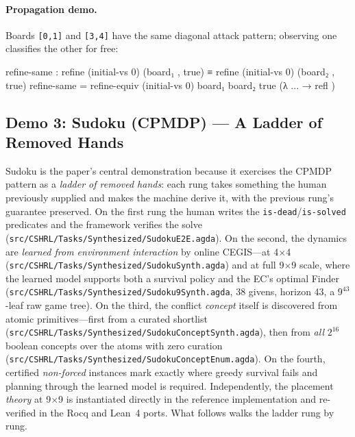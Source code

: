 \documentclass[9pt,a4paper]{article}
\newcommand{\fpath}[1]{\nolinkurl{#1}}
\theoremstyle{plain}
\theoremstyle{definition}
\theoremstyle{remark}
\begin{document}
\paragraph{Propagation demo.}  Boards \texttt{[0,1]} and \texttt{[3,4]} have the same diagonal attack pattern; observing one classifies the other for free:
\begin{spec}
refine-same : refine (initial-vs 0) (board₁ , true)
            ≡ refine (initial-vs 0) (board₂ , true)
refine-same = refine-equiv (initial-vs 0) board₁ board₂ true (λ { ... → refl })
\end{spec}

\subsection{Demo 3: Sudoku (CPMDP) --- A Ladder of Removed Hands}
\label{sec:e2e-sudoku}

Sudoku is the paper's central demonstration because it exercises the CPMDP pattern as a \emph{ladder of removed hands}: each rung takes something the human previously supplied and makes the machine derive it, with the previous rung's guarantee preserved.  On the first rung the human writes the \texttt{is-dead}/\texttt{is-solved} predicates and the framework verifies the solve (\fpath{src/CSHRL/Tasks/Synthesized/SudokuE2E.agda}).  On the second, the dynamics are \emph{learned from environment interaction} by online CEGIS---at 4$\times$4 (\fpath{src/CSHRL/Tasks/Synthesized/SudokuSynth.agda}) and at full 9$\times$9 scale, where the learned model supports both a survival policy and the EC's optimal Finder (\fpath{src/CSHRL/Tasks/Synthesized/Sudoku9Synth.agda}, 38 givens, horizon 43, a $9^{43}$-leaf raw game tree).  On the third, the conflict \emph{concept} itself is discovered from atomic primitives---first from a curated shortlist (\fpath{src/CSHRL/Tasks/Synthesized/SudokuConceptSynth.agda}), then from \emph{all} $2^{16}$ boolean concepts over the atoms with zero curation (\fpath{src/CSHRL/Tasks/Synthesized/SudokuConceptEnum.agda}).  On the fourth, certified \emph{non-forced} instances mark exactly where greedy survival fails and planning through the learned model is required.  Independently, the placement \emph{theory} at 9$\times$9 is instantiated directly in the reference implementation and re-verified in the Rocq and Lean~4 ports.  What follows walks the ladder rung by rung.
\end{document}
